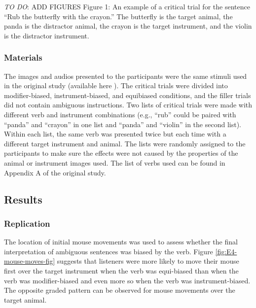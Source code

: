 \documentclass[
  english,
  man,floatsintext]{apa6}
\begin{document}
\emph{TO DO}: ADD FIGURES Figure 1: An example of a critical trial for the sentence ``Rub the butterfly with the crayon.'' The butterfly is the target animal, the panda is the distractor animal, the crayon is the target instrument, and the violin is the distractor instrument.

\hypertarget{materials-1}{%
\subsubsection{Materials}\label{materials-1}}

The images and audios presented to the participants were the same stimuli used in the original study (available here ). The critical trials were divided into modifier-biased, instrument-biased, and equibiased conditions, and the filler trials did not contain ambiguous instructions. Two lists of critical trials were made with different verb and instrument combinations (e.g., ``rub'' could be paired with ``panda'' and ``crayon'' in one list and ``panda'' and ``violin'' in the second list). Within each list, the same verb was presented twice but each time with a different target instrument and animal. The lists were randomly assigned to the participants to make sure the effects were not caused by the properties of the animal or instrument images used. The list of verbs used can be found in Appendix A of the original study.

\hypertarget{results-3}{%
\subsection{Results}\label{results-3}}

\hypertarget{replication-2}{%
\subsubsection{Replication}\label{replication-2}}

The location of initial mouse movements was used to assess whether the final interpretation of ambiguous sentences was biased by the verb. Figure \ref{fig:E4-mouse-moves-fig} suggests that listeners were more likely to move their mouse first over the target instrument when the verb was equi-biased than when the verb was modifier-biased and even more so when the verb was instrument-biased. The opposite graded pattern can be observed for mouse movements over the target animal.
\end{document}
